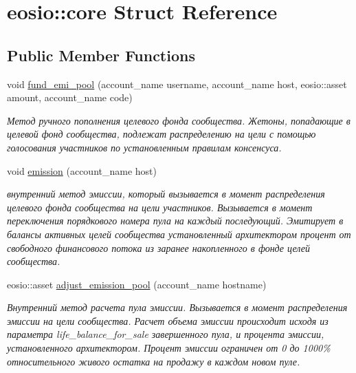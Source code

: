 \hypertarget{structeosio_1_1core}{}\section{eosio\+:\+:core Struct Reference}
\label{structeosio_1_1core}
\subsection*{Public Member Functions}
\begin{DoxyCompactItemize}
\item 
void \mbox{\hyperlink{structeosio_1_1core_afe6cd2a363060de08f71f3f6a42079f7}{fund\+\_\+emi\+\_\+pool}} (account\+\_\+name username, account\+\_\+name host, eosio\+::asset amount, account\+\_\+name code)
\begin{DoxyCompactList}\small\item\em Метод ручного пополнения целевого фонда сообщества. Жетоны, попадающие в целевой фонд сообщества, подлежат распределению на цели с помощью голосования участников по установленным правилам консенсуса. \end{DoxyCompactList}\item 
void \mbox{\hyperlink{structeosio_1_1core_aa6d6b898bb6a6ff984ca47ff45bb2504}{emission}} (account\+\_\+name host)
\begin{DoxyCompactList}\small\item\em внутренний метод эмиссии, который вызывается в момент распределения целевого фонда сообщества на цели участников. Вызывается в момент переключения порядкового номера пула на каждый последующий. Эмитирует в балансы активных целей сообщества установленный архитектором процент от свободного финансового потока из заранее накопленного в фонде целей сообщества. \end{DoxyCompactList}\item 
eosio\+::asset \mbox{\hyperlink{structeosio_1_1core_acf8abb1c3da1cc66eeb0777a3ebd74a6}{adjust\+\_\+emission\+\_\+pool}} (account\+\_\+name hostname)
\begin{DoxyCompactList}\small\item\em Внутренний метод расчета пула эмиссии. Вызывается в момент распределения эмиссии на цели сообщества. Расчет объема эмиссии происходит исходя из параметра life\+\_\+balance\+\_\+for\+\_\+sale завершенного пула, и процента эмиссии, установленного архитектором. Процент эмиссии ограничен от 0 до 1000\% относительного живого остатка на продажу в каждом новом пуле. \end{DoxyCompactList}\item 

\end{DoxyCompactItemize}
